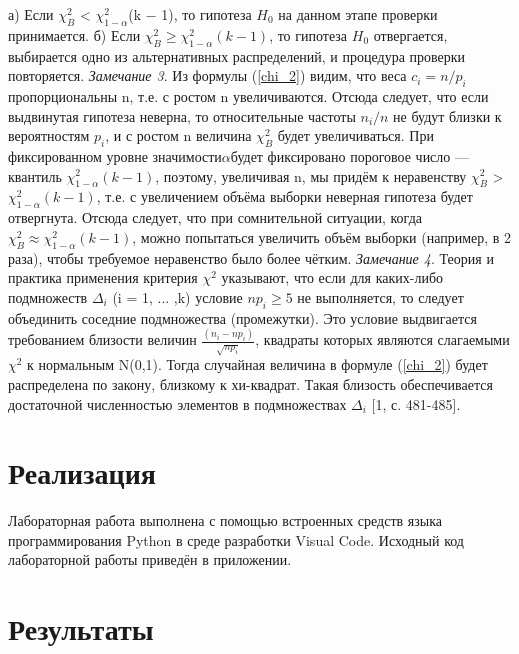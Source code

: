 \documentclass[12pt,a4paper]{scrartcl}
\begin{document}
    а) Если $\chi^{2}_{B}$ < $\chi^{2}_{1-\alpha}$(k $-$ 1), то гипотеза $H_{0}$ на данном этапе проверки принимается. 
    \newline
    б) Если $\chi^{2}_{B} \geq \chi^{2}_{1-\alpha}(k -1)$, то гипотеза $H_{0}$ отвергается, выбирается одно из альтернативных распределений, и процедура проверки повторяется.
    \newline
    \textit{Замечание 3}. Из формулы (\ref{chi_2}) видим, что веса $c_{i} = n/p_{i}$ пропорциональны n, т.е. с ростом n увеличиваются. Отсюда следует, что если выдвинутая гипотеза неверна, то относительные частоты $n_{i}/n$ не будут близки к вероятностям $p_{i}$, и с ростом n величина  $\chi^{2}_{B}$  будет увеличиваться. При фиксированном уровне значимости$ \alpha $будет фиксировано пороговое число — квантиль $\chi^{2}_{1-\alpha}(k-1)$, поэтому, увеличивая n, мы придём к неравенству $\chi^{2}_{B}$ > $\chi^{2}_{1-\alpha}(k-1)$, т.е. с увеличением объёма выборки неверная гипотеза будет отвергнута.
    \newline
    Отсюда следует, что при сомнительной ситуации, когда $\chi^{2}_{B} \approx \chi^{2}_{1-\alpha}(k-1)$, можно попытаться увеличить объём выборки (например, в 2 раза), чтобы требуемое неравенство было более чётким.
    \newline
    \textit{Замечание 4}. Теория и практика применения критерия  $\chi^{2}$ указывают, что если для каких-либо подмножеств $\Delta_{i}$ (i = 1, ... ,k) условие $np_{i} \geq 5$ не выполняется, то следует объединить соседние подмножества (промежутки).
    \newline
    Это условие выдвигается требованием близости величин $\frac{(n_{i} -np_{i})}{\sqrt{np_{i}}}$, квадраты которых являются слагаемыми $\chi^{2}$  к нормальным N(0,1). Тогда случайная величина в формуле (\ref{chi_2}) будет распределена по закону, близкому к хи-квадрат. Такая близость обеспечивается достаточной численностью элементов в подмножествах $\Delta_{i}$ [1, с. 481-485].


\section {Реализация}
Лабораторная работа выполнена с помощью встроенных средств языка программирования Python в среде разработки Visual Code. Исходный код лабораторной работы приведён в приложении.
 
\section{Результаты}
\end{document}
